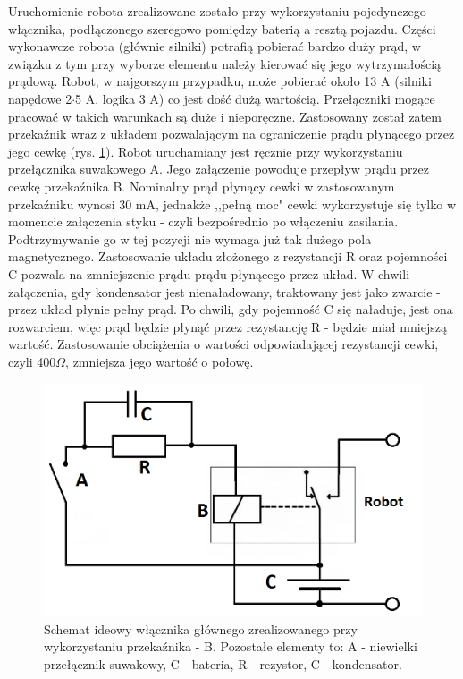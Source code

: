 Uruchomienie robota zrealizowane zostało przy wykorzystaniu pojedynczego włącznika, podłączonego szeregowo pomiędzy baterią a resztą pojazdu. Części wykonawcze robota (głównie silniki) potrafią pobierać bardzo duży prąd, w związku z tym przy wyborze elementu należy kierować się jego wytrzymałością prądową. Robot, w najgorszym przypadku, może pobierać około 13 A (silniki napędowe 2$\cdot$5 A, logika 3 A) co jest dość dużą wartością. Przełączniki mogące pracować w takich warunkach są duże i nieporęczne. Zastosowany został zatem przekaźnik wraz z układem pozwalającym na ograniczenie prądu płynącego przez jego cewkę (rys. \ref{wyla}). Robot uruchamiany jest ręcznie przy wykorzystaniu przełącznika suwakowego A. Jego załączenie powoduje przepływ prądu przez cewkę przekaźnika B. Nominalny prąd płynący cewki w zastosowanym przekaźniku wynosi 30 mA, jednakże ,,pełną moc" cewki wykorzystuje się tylko w momencie załączenia styku - czyli bezpośrednio po włączeniu zasilania. Podtrzymywanie go w tej pozycji nie wymaga już tak dużego pola magnetycznego. Zastosowanie układu złożonego z rezystancji R oraz pojemności C pozwala na zmniejszenie prądu prądu płynącego przez układ. W chwili załączenia, gdy kondensator jest nienaładowany, traktowany jest jako zwarcie - przez układ płynie pełny prąd. Po chwili, gdy pojemność C się naładuje, jest ona rozwarciem, więc prąd będzie płynąć przez rezystancję R - będzie miał mniejszą wartość. Zastosowanie obciążenia o wartości odpowiadającej rezystancji cewki, czyli 400$\Omega$, zmniejsza jego wartość o połowę.

  \begin{figure}[H]
    \begin{center}
      \includegraphics[scale=0.28]{imgs/wylaczniik.png}
 	\caption[Wyłącznik główny.]{\small{Schemat ideowy włącznika głównego zrealizowanego przy wykorzystaniu przekaźnika - B. Pozostałe elementy to: A - niewielki przełącznik suwakowy, C - bateria, R - rezystor, C - kondensator.}}
	\label{wyla}
    \end{center}
  \end{figure}   
  
